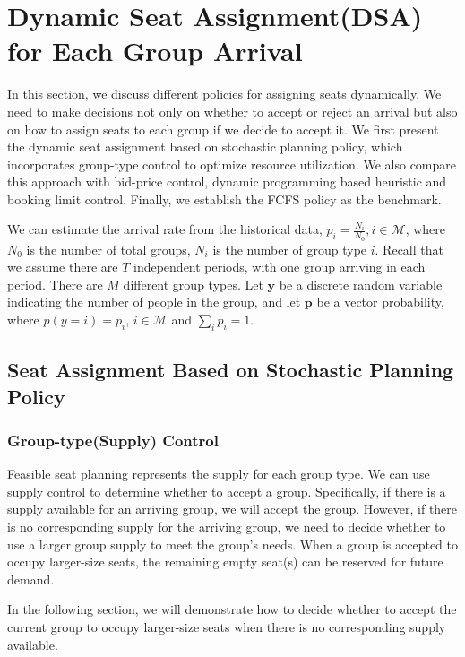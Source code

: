 \section{Dynamic Seat Assignment(DSA) for Each Group Arrival}
In this section, we discuss different policies for assigning seats dynamically. We need to make decisions not only on whether to accept or reject an arrival but also on how to assign seats to each group if we decide to accept it. We first present the dynamic seat assignment based on stochastic planning policy, which incorporates group-type control to optimize resource utilization. We also compare this approach with bid-price control, dynamic programming based heuristic and booking limit control. Finally, we establish the FCFS policy as the benchmark.

We can estimate the arrival rate from the historical data, $p_i = \frac{N_{i}}{N_{0}}, i \in \mathcal{M}$, where $N_{0}$ is the number of total groups, $N_{i}$ is the number of group type $i$. Recall that we assume there are $T$ independent periods, with one group arriving in each period. There are $M$ different group types. Let $\mathbf{y}$ be a discrete random variable indicating the number of people in the group, and let $\mathbf{p}$ be a vector probability, where $p(y = i) = p_i$, $i \in \mathcal{M}$ and $\sum_{i} p_{i} =1$.

\subsection{Seat Assignment Based on Stochastic Planning Policy}

\subsubsection{Group-type(Supply) Control}\label{nested_policy}
Feasible seat planning represents the supply for each group type. We can use supply control to determine whether to accept a group. Specifically, if there is a supply available for an arriving group, we will accept the group. However, if there is no corresponding supply for the arriving group, we need to decide whether to use a larger group supply to meet the group's needs. When a group is accepted to occupy larger-size seats, the remaining empty seat(s) can be reserved for future demand.

In the following section, we will demonstrate how to decide whether to accept the current group to occupy larger-size seats when there is no corresponding supply available.

